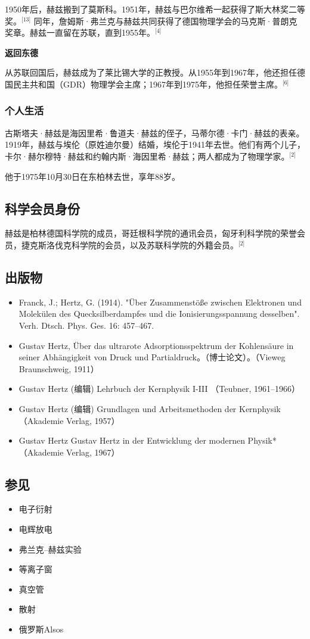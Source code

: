 1950年后，赫兹搬到了莫斯科。1951年，赫兹与巴尔维希一起获得了斯大林奖二等奖。\(^\text{[13]}\) 同年，詹姆斯·弗兰克与赫兹共同获得了德国物理学会的马克斯·普朗克奖章。赫兹一直留在苏联，直到1955年。\(^\text{[4]}\)

\textbf{返回东德}

从苏联回国后，赫兹成为了莱比锡大学的正教授。从1955年到1967年，他还担任德国民主共和国（GDR）物理学会主席；1967年到1975年，他担任荣誉主席。\(^\text{[6]}\)
\subsubsection{个人生活}
古斯塔夫·赫兹是海因里希·鲁道夫·赫兹的侄子，马蒂尔德·卡门·赫兹的表亲。1919年，赫兹与埃伦（原姓迪尔曼）结婚，埃伦于1941年去世。他们有两个儿子，卡尔·赫尔穆特·赫兹和约翰内斯·海因里希·赫兹；两人都成为了物理学家。\(^\text{[2]}\)

他于1975年10月30日在东柏林去世，享年88岁。
\subsection{科学会员身份}
赫兹是柏林德国科学院的成员，哥廷根科学院的通讯会员，匈牙利科学院的荣誉会员，捷克斯洛伐克科学院的会员，以及苏联科学院的外籍会员。\(^\text{[2]}\)

\subsection{出版物}
\begin{itemize}
\item Franck, J.; Hertz, G. (1914). "Über Zusammenstöße zwischen Elektronen und Molekülen des Quecksilberdampfes und die Ionisierungsspannung desselben". Verh. Dtsch. Phys. Ges. 16: 457–467.
\item Gustav Hertz, Über das ultrarote Adsorptionsspektrum der Kohlensäure in seiner Abhängigkeit von Druck und Partialdruck。（博士论文）。（Vieweg Braunschweig, 1911）
\item Gustav Hertz (编辑) Lehrbuch der Kernphysik I-III （Teubner, 1961–1966）
\item Gustav Hertz (编辑) Grundlagen und Arbeitsmethoden der Kernphysik（Akademie Verlag, 1957）
\item Gustav Hertz Gustav Hertz in der Entwicklung der modernen Physik*（Akademie Verlag, 1967）
\end{itemize}
\subsection{参见}
\begin{itemize}
\item 电子衍射
\item 电辉放电
\item 弗兰克–赫兹实验
\item 等离子窗
\item 真空管
\item 散射
\item 俄罗斯Alsos
\end{itemize}

